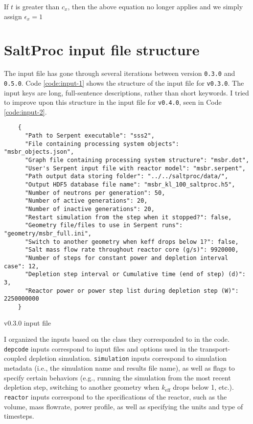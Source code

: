 If $t$ is greater than $c_{x}$, then the above equation no longer applies and we simply assign $\epsilon_{x} = 1$

\chapter{SaltProc input file structure}
\label{appex:input-files}

The \SaltProc input file has gone through several iterations between version
\verb,0.3.0, and \verb,0.5.0,. Code \ref{code:input-1} shows the structure
of the input file for \SaltProc \verb,v0.3.0,. The input keys are long,
full-sentence descriptions, rather than short keywords. I tried to improve upon
this structure in the input file for \SaltProc \verb,v0.4.0,, seen in
Code \ref{code:input-2}.

\begin{listing}[!ht]
    \begin{verbatim}
    {
      "Path to Serpent executable": "sss2",
      "File containing processing system objects": "msbr_objects.json",
      "Graph file containing processing system structure": "msbr.dot",
      "User's Serpent input file with reactor model": "msbr.serpent",
      "Path output data storing folder": "../../saltproc/data/",
      "Output HDF5 database file name": "msbr_kl_100_saltproc.h5",
      "Number of neutrons per generation": 50,
      "Number of active generations": 20,
      "Number of inactive generations": 20,
      "Restart simulation from the step when it stopped?": false,
      "Geometry file/files to use in Serpent runs": "geometry/msbr_full.ini",
      "Switch to another geometry when keff drops below 1?": false,
      "Salt mass flow rate throughout reactor core (g/s)": 9920000,
      "Number of steps for constant power and depletion interval case": 12,
      "Depletion step interval or Cumulative time (end of step) (d)": 3,
      "Reactor power or power step list during depletion step (W)": 2250000000
    }
    \end{verbatim}
    \caption{\SaltProc v0.3.0 input file}
    \label{code:input-1}
\end{listing}

I organized the inputs based on the class they corresponded to in the \SaltProc
code. \verb.depcode. inputs correspond to input files and options used in the
transport-coupled depletion simulation. \verb.simulation. inputs correspond to
simulation metadata (i.e., the simulation name and results file name), as well as
flags to specify certain behaviors (e.g., running the simulation from the most
recent depletion step, switching to another geometry when $k_{\text{eff}}$ drops below
1, etc.). \verb.reactor. inputs correspond to the specifications of the reactor,
such as the volume, mass flowrate, power profile, as well as 
specifying the units and type of timesteps.

